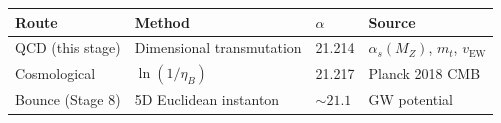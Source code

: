\documentclass[
  11pt,
]{article}
\begin{document}
\begin{longtable}[]{@{}llll@{}}
\toprule
\begin{minipage}[b]{0.22\columnwidth}\raggedright
Route\strut
\end{minipage} & \begin{minipage}[b]{0.22\columnwidth}\raggedright
Method\strut
\end{minipage} & \begin{minipage}[b]{0.22\columnwidth}\raggedright
\(\alpha\)\strut
\end{minipage} & \begin{minipage}[b]{0.22\columnwidth}\raggedright
Source\strut
\end{minipage}\tabularnewline
\midrule
\endhead
\begin{minipage}[t]{0.22\columnwidth}\raggedright
QCD (this stage)\strut
\end{minipage} & \begin{minipage}[t]{0.22\columnwidth}\raggedright
Dimensional transmutation\strut
\end{minipage} & \begin{minipage}[t]{0.22\columnwidth}\raggedright
21.214\strut
\end{minipage} & \begin{minipage}[t]{0.22\columnwidth}\raggedright
\(\alpha_s(M_Z)\), \(m_t\), \(v_\text{EW}\)\strut
\end{minipage}\tabularnewline
\begin{minipage}[t]{0.22\columnwidth}\raggedright
Cosmological\strut
\end{minipage} & \begin{minipage}[t]{0.22\columnwidth}\raggedright
\(\ln(1/\eta_B)\)\strut
\end{minipage} & \begin{minipage}[t]{0.22\columnwidth}\raggedright
21.217\strut
\end{minipage} & \begin{minipage}[t]{0.22\columnwidth}\raggedright
Planck 2018 CMB\strut
\end{minipage}\tabularnewline
\begin{minipage}[t]{0.22\columnwidth}\raggedright
Bounce (Stage 8)\strut
\end{minipage} & \begin{minipage}[t]{0.22\columnwidth}\raggedright
5D Euclidean instanton\strut
\end{minipage} & \begin{minipage}[t]{0.22\columnwidth}\raggedright
\(\sim 21.1\)\strut
\end{minipage} & \begin{minipage}[t]{0.22\columnwidth}\raggedright
GW potential\strut
\end{minipage}\tabularnewline
\bottomrule
\end{longtable}
\end{document}
